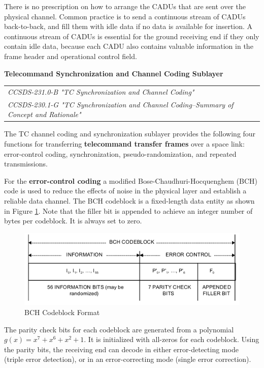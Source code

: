 There is no prescription on how to arrange the CADUs that are sent over the physical channel. Common practice is to send a continuous stream of CADUs back-to-back, and fill them with idle data if no data is available for insertion. A continuous stream of CADUs is essential for the ground receiving end if they only contain idle data, because each CADU also contains valuable information in the frame header and operational control field.

\textbf{Telecommand Synchronization and Channel Coding Sublayer}

\begin{tabular}{l}
\textit{CCSDS-231.0-B "TC Synchronization and Channel Coding" \cite{CCSDS-231.0-B}} \\
\textit{CCSDS-230.1-G "TC Synchronization and Channel Coding--Summary of Concept and Rationale" \cite{CCSDS-230.1-G}}
\end{tabular}

The TC channel coding and synchronization sublayer provides the following four functions for transferring \textbf{telecommand transfer frames} over a space link: error-control coding, synchronization, pseudo-randomization, and repeated transmissions. 

For the \textbf{error-control coding} a modified Bose-Chaudhuri-Hocquenghem (BCH) code is used to reduce the effects of noise in the physical layer and establish a reliable data channel. The BCH codeblock is a fixed-length data entity as shown in Figure \ref{fig:BCH Codeblock Format}. Note that the filler bit is appended to achieve an integer number of bytes per codeblock. It is always set to zero. 

\begin{figure}[h]
\centering\includegraphics[scale=0.7]{fig/bch_codeblock_format}
\caption{BCH Codeblock Format}
\label{fig:BCH Codeblock Format}
\end{figure}

The parity check bits for each codeblock are generated from a polynomial $g(x) = x^{7} + x^{6} +x^{2} + 1$. It is initialized with all-zeros for each codeblock. Using the parity bits, the receiving end can decode in either error-detecting mode (triple error detection), or in an error-correcting mode (single error correction). 

